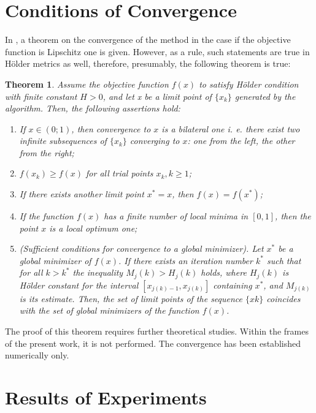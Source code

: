 \documentclass[procedia]{easychair}
\newtheorem{theorem}{Theorem}
\begin{document}
\section{Conditions of Convergence}
In \cite{sergLocalTuning}, a theorem on the convergence of the method in the case if the objective
function is Lipschitz one is given. However, as a rule, such statements are true in
Hölder metrics as well, therefore, presumably, the following theorem is true:

\begin{theorem}
Assume the objective function \(f(x)\) to  satisfy Hölder condition with finite
constant \(H > 0\), and let x be a limit point of \(\{x_k\}\) generated by the algorithm.
Then, the following assertions hold:
\begin{enumerate}
  \item If \(x\in(0;1)\), then convergence to \(x\) is a bilateral one i. e. there
  exist two infinite subsequences of \(\{x_k\}\) converging to \(x\): one from the
  left, the other from the right;
  \item \(f(x_k) \geqslant f(x)\) for all trial points \(x_k, k \geqslant 1\);
  \item If there exists another limit point \(x^* = x\), then \(f(x) = f(x^*)\);
  \item If the function \(f(x)\) has a finite number of local minima in \([0, 1]\),
  then the point \(x\) is a local optimum one;
  \item (Sufficient conditions for convergence to a global minimizer). Let \(x^*\)
  be a global minimizer of \(f(x)\). If there exists an iteration number \(k^*\)
  such that for all \(k > k^*\) the inequality
  \(M_j(k) > H_j(k)\) holds, where \(H_j(k)\) is Hölder constant for the interval
  \([x_{j(k)-1}, x_{j(k)}]\) containing \(x^*\), and \(M_{j(k)}\) is its estimate.
  Then, the set of limit points of the sequence \(\{xk\}\) coincides with the set
  of global minimizers of the function \(f(x)\).
\end{enumerate}
\end{theorem}

The proof of this theorem requires further theoretical studies. Within the frames of
the present work, it is not performed. The convergence has been established numerically only.

\section{Results of Experiments}
\label{sect:experiments}
\end{document}
